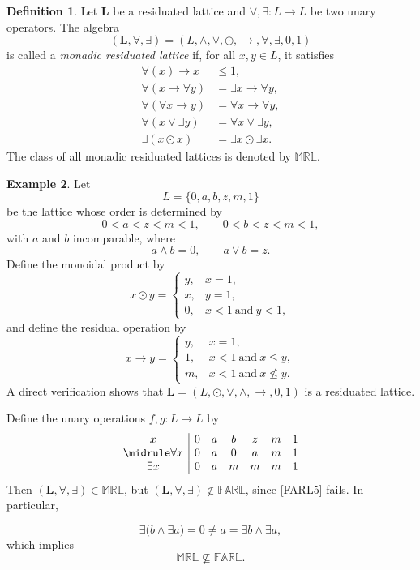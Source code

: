 \documentclass[final,12pt,times]{elsarticle}
\theoremstyle{plain}
\theoremstyle{definition}
\newtheorem{definition}{Definition}[section]
\newtheorem{example}[definition]{Example}
\theoremstyle{break}
\newcommand{\FARL}{\mathbb{FARL}}
\newcommand{\MRL}{\mathbb{MRL}}
\begin{document}
\begin{definition}\label{def:MRL}
Let
$\mathbf{L}$ be a residuated lattice and
$\forall,\exists:L\to L$ be two unary operators.  The algebra
\[(\mathbf{L},\forall,\exists)=(L,\wedge,\vee,\odot,\to,\forall,\exists,0,1)
\]
is called a \emph{monadic residuated lattice} if, for all
$x,y\in L$, it satisfies
\begin{align}
 \forall(x)\rightarrow x&\le1,
   \tag{Mon1}\label{Mon1}\\
 \forall(x\to \forall y)&=\exists x\to \forall y,
   \tag{Mon2}\label{Mon2}\\
 \forall(\forall x\to y)&=\forall x\to \forall y,
   \tag{Mon3}\label{Mon3}\\
 \forall(x\vee \exists y)&=\forall x\vee \exists y,
   \tag{Mon4}\label{Mon4}\\
\exists(x\odot x)&=\exists x\odot \exists x.
   \tag{Mon5}\label{Mon5}
\end{align}
The class of all monadic residuated lattices is denoted by
$\MRL$.
\end{definition}

\begin{example}
Let
\[
L=\{0,a,b,z,m,1\}
\]
be the lattice whose order is determined by
\[
0<a<z<m<1,
\qquad
0<b<z<m<1,
\]
with \(a\) and \(b\) incomparable, where
\[
a\wedge b=0,
\qquad
a\vee b=z.
\]
Define the monoidal product by
\[
x\odot y=
\begin{cases}
y, & x=1,\\
x, & y=1,\\
0, & x<1\ \text{and}\ y<1,
\end{cases}
\]
and define the residual operation by
\[
x\to y=
\begin{cases}
y, & x=1,\\
1, & x<1\ \text{and}\ x\leq y,\\
m, & x<1\ \text{and}\ x\nleq y.
\end{cases}
\]
A direct verification shows that
$\mathbf{L}=(L,\odot,\vee,\wedge,\to,0,1)$ is a residuated lattice. 

Define the unary operations \(f,g\colon L\to L\) by
\[
\begin{array}{c|cccccc}
x      &0&a&b&z&m&1\\
\midrule
\forall x   &0&a&0&a&m&1\\
\exists x   &0&a&m&m&m&1
\end{array}
\]
Then $(\mathbf{L},\forall,\exists) \in \MRL$, but $(\mathbf{L},\forall,\exists)\notin\FARL$, since
\eqref{FARL5} fails. In particular,

\[
\exists\bigl(b\wedge \exists a\bigr)
=
0
\neq
a
=
\exists b\wedge \exists a,
\]
which implies
\[
\MRL\nsubseteq \FARL.
\]
\end{example}
\end{document}

